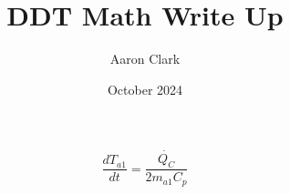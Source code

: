 \documentclass[16pt]{article}
\title{DDT Math Write Up}
\author{Aaron Clark}
\date{October 2024}
\begin{document}
\maketitle
\Large
\pagebreak

\begin{equation}
    \frac{dT_{a1}}{dt}=\frac{\dot{Q_{C}}}{2m_{a1}C_p}
\end{equation}
\end{document}
